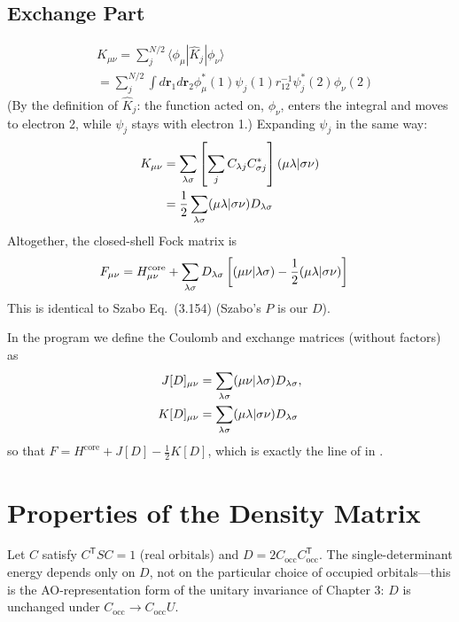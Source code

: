 \subsection{Exchange Part}

\begin{align*}
&K_{\mu \nu} = \sum_j^{N/2} \langle \phi_\mu|\hat{K}_j|\phi_\nu\rangle \\
&= \sum_j^{N/2} \int d\mathbf{r}_1 d\mathbf{r}_2 \phi_\mu^*(1) \psi_j(1) r_{12}^{-1} \psi_j^*(2) \phi_\nu(2)
\end{align*}
(By the definition of $\hat{K}_j$: the function acted on, $\phi_\nu$, enters the integral and moves to electron 2, while $\psi_j$ stays with electron 1.) Expanding $\psi_j$ in the same way:
\begin{align*}
K_{\mu \nu} &= \sum_{\lambda \sigma} \left[ \sum_j C_{\lambda j} C_{\sigma j}^* \right] (\mu \lambda\vert \sigma \nu) \\
&= \frac{1}{2} \sum_{\lambda \sigma} (\mu \lambda\vert \sigma \nu) D_{\lambda \sigma}
\end{align*}
Altogether, the closed-shell Fock matrix is
\begin{align}\label{eq:fock-ao}
F_{\mu \nu} &= H^{\text{core}}_{\mu \nu} + \sum_{\lambda \sigma} D_{\lambda \sigma} \left[ (\mu \nu\vert \lambda \sigma) - \frac{1}{2} (\mu \lambda\vert \sigma \nu) \right]
\end{align}
This is identical to Szabo Eq.~(3.154) (Szabo's $P$ is our $D$).

In the program we define the Coulomb and exchange matrices (without factors) as
\begin{align*}
J[D]_{\mu \nu} &= \sum_{\lambda \sigma} (\mu \nu\vert \lambda \sigma) D_{\lambda \sigma}, \\
K[D]_{\mu \nu} &= \sum_{\lambda \sigma} (\mu \lambda\vert \sigma \nu) D_{\lambda \sigma}
\end{align*}
so that $F = H^{\text{core}} + J[D] - \frac{1}{2} K[D]$, which is exactly the line  of  in .

\section{Properties of the Density Matrix}

Let $C$ satisfy $C^{\mathsf T} S C = 1$ (real orbitals) and $D = 2 C_{\text{occ}} C_{\text{occ}}^{\mathsf T}$. The single-determinant energy depends only on $D$, not on the particular choice of occupied orbitals---this is the AO-representation form of the unitary invariance of Chapter 3: $D$ is unchanged under $C_{\text{occ}} \rightarrow C_{\text{occ}} U$.

